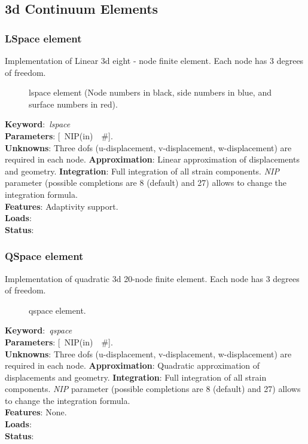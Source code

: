 \documentclass[12pt,dvips]{article}
\newcommand{\descitem}[1]{{\noindent \bf #1}:}
\newcommand{\elemkeyword}[1]{\descitem{Keyword}~{\em #1}}
\newcommand{\elemparam}[2]{{{#1\tiny (#2)}~~\#}}
\newcommand{\optelemparam}[2]{{[~\elemparam{#1}{#2}]}}
\newcommand{\param}[1]{{\it #1}}
\begin{document}
\subsection{3d Continuum Elements}
\subsubsection{LSpace element}
Implementation of Linear 3d  eight - node 
finite element. Each node has 3 degrees of freedom.
\begin{figure}[tb]
\centerline{}
\caption{lspace element (Node numbers in black, side numbers in blue,
and surface numbers in red).}
\end{figure}

\elemkeyword{lspace}\\
\descitem{Parameters} \optelemparam{NIP}{in}. \\
\descitem{Unknowns}
Three dofs (u-displacement, v-displacement, w-displacement) are required in each node.
\descitem{Approximation} Linear approximation of displacements and
geometry.
\descitem{Integration}
Full integration of all strain components.
\param{NIP} parameter (possible completions are 8 (default) and 27)
allows to change the integration formula.\\
\descitem{Features} Adaptivity support.\\
\descitem{Loads} \\
\descitem{Status} 

\subsubsection{QSpace element}
Implementation of quadratic 3d  20-node 
finite element. Each node has 3 degrees of freedom.
\begin{figure}[tb]
\centerline{}
\caption{qspace element.}
\end{figure}

\elemkeyword{qspace}\\
\descitem{Parameters} \optelemparam{NIP}{in}. \\
\descitem{Unknowns}
Three dofs (u-displacement, v-displacement, w-displacement) are required in each node.
\descitem{Approximation} Quadratic approximation of displacements and
geometry.
\descitem{Integration}
Full integration of all strain components.
\param{NIP} parameter (possible completions are 8 (default) and 27)
allows to change the integration formula.\\
\descitem{Features} None.\\
\descitem{Loads} \\
\descitem{Status} 
\end{document}
